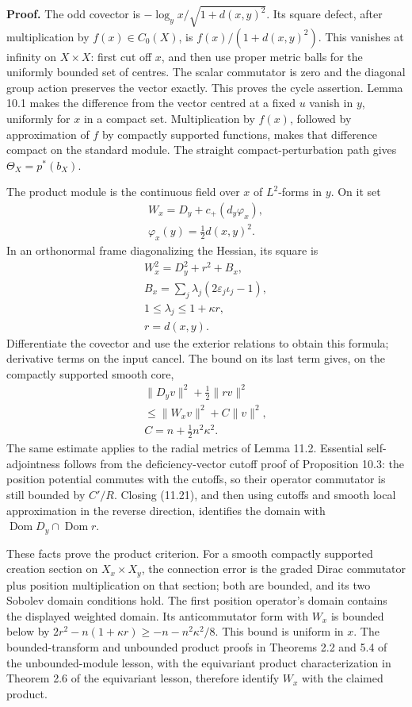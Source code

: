 \documentclass[
  11pt,
]{article}
\begin{document}
\textbf{Proof.} The odd covector is \(-\log_yx/\sqrt{1+d(x,y)^2}\). Its
square defect, after multiplication by \(f(x)\in C_0(X)\), is
\(f(x)/(1+d(x,y)^2)\). This vanishes at infinity on \(X\times X\): first
cut off \(x\), and then use proper metric balls for the uniformly
bounded set of centres. The scalar commutator is zero and the diagonal
group action preserves the vector exactly. This proves the cycle
assertion. Lemma 10.1 makes the difference from the vector centred at a
fixed \(u\) vanish in \(y\), uniformly for \(x\) in a compact set.
Multiplication by \(f(x)\), followed by approximation of \(f\) by
compactly supported functions, makes that difference compact on the
standard module. The straight compact-perturbation path gives
\(\Theta_X=p^*(b_X)\).

The product module is the continuous field over \(x\) of \(L^2\)-forms
in \(y\). On it set \[
\begin{gathered}
W_x=D_y+c_+(d_y\varphi_x),\\
\varphi_x(y)=\tfrac12d(x,y)^2.
\end{gathered}
\tag{11.19}
\] In an orthonormal frame diagonalizing the Hessian, its square is \[
\begin{gathered}
W_x^2=D_y^2+r^2+B_x,\\
B_x=\sum_j\lambda_j(2\varepsilon_j\iota_j-1),\\
1\leq\lambda_j\leq1+\kappa r,\\
r=d(x,y).
\end{gathered}
\tag{11.20}
\] Differentiate the covector and use the exterior relations to obtain
this formula; derivative terms on the input cancel. The bound on its
last term gives, on the compactly supported smooth core, \[
\begin{gathered}
\|D_yv\|^2+\tfrac12\|rv\|^2\\
\leq\|W_xv\|^2+C\|v\|^2,\\
C=n+\tfrac12n^2\kappa^2.
\end{gathered}
\tag{11.21}
\] The same estimate applies to the radial metrics of Lemma 11.2.
Essential self-adjointness follows from the deficiency-vector cutoff
proof of Proposition 10.3: the position potential commutes with the
cutoffs, so their operator commutator is still bounded by \(C'/R\).
Closing (11.21), and then using cutoffs and smooth local approximation
in the reverse direction, identifies the domain with
\(\operatorname{Dom}D_y\cap\operatorname{Dom}r\).

These facts prove the product criterion. For a smooth compactly
supported creation section on \(X_x\times X_y\), the connection error is
the graded Dirac commutator plus position multiplication on that
section; both are bounded, and its two Sobolev domain conditions hold.
The first position operator's domain contains the displayed weighted
domain. Its anticommutator form with \(W_x\) is bounded below by
\(2r^2-n(1+\kappa r)\geq-n-n^2\kappa^2/8\). This bound is uniform in
\(x\). The bounded-transform and unbounded product proofs in Theorems
2.2 and 5.4 of the unbounded-module lesson, with the equivariant product
characterization in Theorem 2.6 of the equivariant lesson, therefore
identify \(W_x\) with the claimed product.
\end{document}
